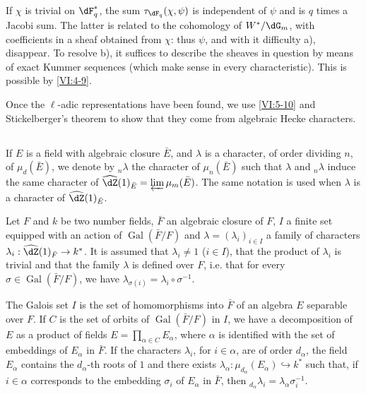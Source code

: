 \documentclass[oneside]{book}
\DeclareMathOperator{\gal}{Gal}
\newcounter{char}
\theoremstyle{sga-source}
\theoremstyle{sga-source-dash}
\theoremstyle{sga-source-dotdash}
\theoremstyle{sga-source-number-note-dash}
\theoremstyle{sga-source-note-number-dotdash}
\theoremstyle{sga-source-example-dotdash}
\theoremstyle{sga-source-inline-number}
\theoremstyle{sga-source-bare-number}
\theoremstyle{sga-source}
\newcommand{\PrintPage}[1]{}\newcommand{\MathPage}[1]{}\newcommand{\PrintCite}[2]{#1}\newcommand{\var}[3]{#2}
\begin{document}
If $\chi$ is trivial on $\dF_q^\ast$, the sum $\tau_{\dF_q}(\chi,\psi)$ 
is independent of $\psi$ and is $q$ times a Jacobi sum. The latter is 
related to the cohomology of $W^\ast/\dG_m$, with coefficients in a sheaf 
obtained from $\chi$: thus $\psi$, and with it difficulty a), disappear. To 
resolve b), it suffices to describe the sheaves in question by means of 
exact \var{K\"ummer}{Kummer}{S45-SOL-0889} sequences (which make sense in every characteristic). This is 
possible by \ref{VI:4-9}. 

Once the $\ell$-adic representations have been found, we use 
\ref{VI:5-10} and Stickelberger's theorem to show that they 
come from algebraic Hecke characters. 





\subsection{}\label{VI:6-1}

If $E$ is a field with algebraic closure $\bar E$, and $\lambda$ is 
a character, of order dividing $n$, of $\mu_d(\bar E)$, we denote by $_n\lambda$ the 
character of $\mu_n(\bar E)$ such that $\lambda$ and $_n \lambda$ induce the 
same character of $\widehat\dZ(1)_{\bar E} = \varprojlim \mu_m(\bar E)$. The 
same notation is used when $\lambda$ is a character of $\widehat\dZ(1)_{\bar E}$.

Let $F$ and $k$ be two number fields, $\bar F$ an algebraic closure of 
$F$, $I$ a finite set equipped with an action of $\gal(\bar F/F)$ and 
$\lambda=(\lambda_i)_{i\in I}$ a family of characters 
$\lambda_i:\widehat\dZ(1)_{\bar F} \to k^\ast$. It is assumed that 
$\lambda_i\ne 1$ ($i\in I$), that \PrintPage{214}
the product of $\lambda_i$ is trivial and that 
the family $\lambda$ is defined over $F$, i.e. that for every 
$\sigma\in \gal(\bar F/F)$, we have 
$\lambda_{\sigma(i)}=\lambda_i\circ \sigma^{-1}$. 

The Galois set $I$ is the set of homomorphisms into $\bar F$ of an 
algebra $E$ separable over $F$. If $C$ is the set of orbits of 
$\gal(\bar F/F)$ in $I$, we have a decomposition of $E$ as a product of fields 
$E=\prod_{\alpha\in C} E_\alpha$, where $\alpha$ is identified with the set of 
embeddings of $E_\alpha$ in $\bar F$. If the characters $\lambda_i$, for 
$i\in \alpha$, are of order $d_\alpha$, the field $E_\alpha$ contains the 
$d_\alpha$-th roots of $1$ and there exists 
$\lambda_\alpha:\mu_{d_\alpha}(E_\alpha) \hookrightarrow k^\ast$ such that, if 
$i\in \alpha$ corresponds to the embedding $\sigma_i$ of $E_\alpha$ in $\bar F$, 
then $_{d_\alpha} \lambda_i = \lambda_\alpha \sigma_i^{-1}$. 
\end{document}
